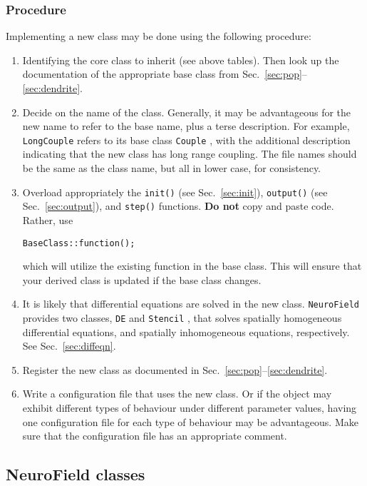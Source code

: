 \documentclass[12pt,a4paper]{article}
\newcommand{\type}[1]{ {\small\small\tt #1} }
\newcommand{\NF}[0]{ \type{NeuroField}}
\begin{document}
\subsubsection{Procedure}

Implementing a new class may be done using the following procedure:
\begin{enumerate}
	\item Identifying the core class to inherit (see above tables). Then look up the documentation of the appropriate base class from Sec.~\ref{sec:pop}--\ref{sec:dendrite}.
	\item Decide on the name of the class. Generally, it may be advantageous for the new name to refer to the base name, plus a terse description. For example, \type{LongCouple} refers to its base class \type{Couple}, with the additional description indicating that the new class has long range coupling. The file names should be the same as the class name, but all in lower case, for consistency.
	\item Overload appropriately the \type{init()} (see Sec.~\ref{sec:init}), \type{output()} (see Sec.~\ref{sec:output}), and \type{step()} functions. {\bf Do not} copy and paste code. Rather, use
		\begin{lstlisting}
BaseClass::function();
		\end{lstlisting}
	which will utilize the existing function in the base class. This will ensure that your derived class is updated if the base class changes. 
	\item It is likely that differential equations are solved in the new class. \NF provides two classes, \type{DE} and \type{Stencil}, that solves spatially homogeneous differential equations, and spatially inhomogeneous equations, respectively. See Sec.~\ref{sec:diffeqn}.
	\item Register the new class as documented in Sec.~\ref{sec:pop}--\ref{sec:dendrite}.
	\item Write a configuration file that uses the new class. Or if the object may exhibit different types of behaviour under different parameter values, having one configuration file for each type of behaviour may be advantageous. Make sure that the configuration file has an appropriate comment.
\end{enumerate}

\subsection{NeuroField classes}
\end{document}
